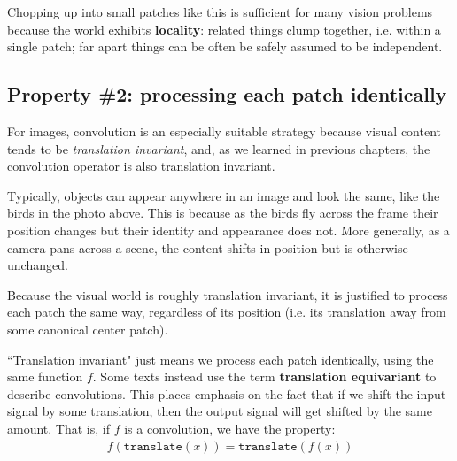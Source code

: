 Chopping up into small patches like this is sufficient for many vision problems because the world exhibits {\bf locality}: related things clump together, i.e. within a single patch; far apart things can be often be safely assumed to be independent.


\subsection{Property \#2: processing each patch identically}

For images, convolution is an especially suitable strategy because visual content tends to be \textit{translation invariant}, and, as we learned in previous chapters, the convolution operator is also translation invariant. 

Typically, objects can appear anywhere in an image and look the same, like the birds in the photo above. This is because as the birds fly across the frame their position changes but their identity and appearance does not. More generally, as a camera pans across a scene, the content shifts in position but is otherwise unchanged.

Because the visual world is roughly translation invariant, it is justified to process each patch the same way, regardless of its position (i.e. its translation away from some canonical center patch).

``Translation invariant" just means we process each patch identically, using the same function $f$. Some texts instead use the term {\bf translation equivariant} to describe convolutions. This places emphasis on the fact that if we shift the input signal by some translation, then the output signal will get shifted by the same amount. That is, if $f$ is a convolution, we have the property:
\begin{align}
    f(\texttt{translate}(x)) = \texttt{translate}(f(x))
\end{align}




